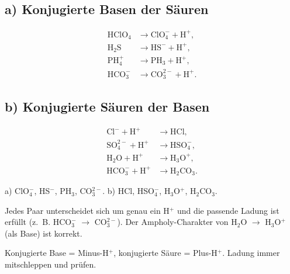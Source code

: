
\subsection*{a) Konjugierte Basen der Säuren}
\begin{align*}
  \mathrm{HClO_4} &\to \mathrm{ClO_4^-} + \mathrm{H^+},\\
  \mathrm{H_2S}    &\to \mathrm{HS^-}  + \mathrm{H^+},\\
  \mathrm{PH_4^+}  &\to \mathrm{PH_3}  + \mathrm{H^+},\\
  \mathrm{HCO_3^-} &\to \mathrm{CO_3^{2-}} + \mathrm{H^+}.
\end{align*}

\subsection*{b) Konjugierte Säuren der Basen}
\begin{align*}
  \mathrm{Cl^-} + \mathrm{H^+} &\to \mathrm{HCl},\\
  \mathrm{SO_4^{2-}} + \mathrm{H^+} &\to \mathrm{HSO_4^-},\\
  \mathrm{H_2O} + \mathrm{H^+} &\to \mathrm{H_3O^+},\\
  \mathrm{HCO_3^-} + \mathrm{H^+} &\to \mathrm{H_2CO_3}.
\end{align*}

\begin{ergebnis}
a) ClO$_4^-$, HS$^-$, PH$_3$, CO$_3^{2-}$.
b) HCl, HSO$_4^-$, H$_3$O$^+$, H$_2$CO$_3$.
\end{ergebnis}

\begin{kontrolle}
Jedes Paar unterscheidet sich um genau ein H$^+$ und die passende Ladung
ist erfüllt (z.~B. HCO$_3^-$ $\to$ CO$_3^{2-}$). Der Ampholy-Charakter von
H$_2$O $\to$ H$_3$O$^+$ (als Base) ist korrekt.
\end{kontrolle}

\begin{merksatz}
Konjugierte Base = Minus-H$^+$, konjugierte Säure = Plus-H$^+$. Ladung
immer mitschleppen und prüfen.
\end{merksatz}
